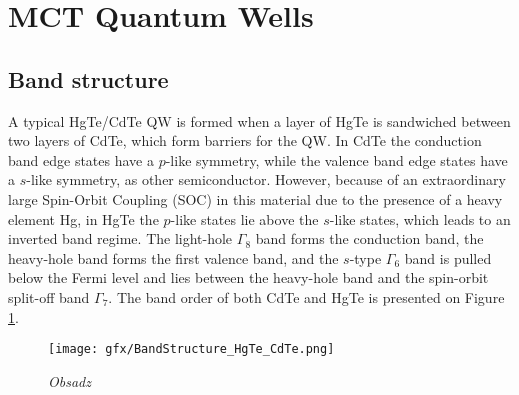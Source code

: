 \documentclass[titlepage,a4paper]{book}
\begin{document}
\section{MCT Quantum Wells}
\subsection{Band structure}
A typical HgTe/CdTe QW is formed when a layer of HgTe is sandwiched between two layers of CdTe, which form barriers for the QW. In CdTe the conduction band edge states have a $p$-like  symmetry, while the valence band edge states have a $s$-like symmetry, as other semiconductor. However, because of an extraordinary large Spin-Orbit Coupling (SOC) in this material due to the presence of a heavy element Hg, in HgTe the $p$-like states lie above the $s$-like states, which leads to an inverted band regime. The light-hole $\Gamma_8$ band forms the conduction band, the heavy-hole band forms the first valence band, and the $s$-type $\Gamma_6$ band is pulled below the Fermi level and lies between the heavy-hole band and the spin-orbit split-off band $\Gamma_7$. The band order of both CdTe and HgTe is presented on Figure \ref{fig:BandStructure_HgTe_CdTe}.

\begin{figure}[ht]
	\centering
	\texttt{[image: gfx/BandStructure\_HgTe\_CdTe.png]}
	\vspace{-10pt}
	\caption{\textit{Obsadz}}
	\label{fig:BandStructure_HgTe_CdTe}
\end{figure} 
\end{document}
